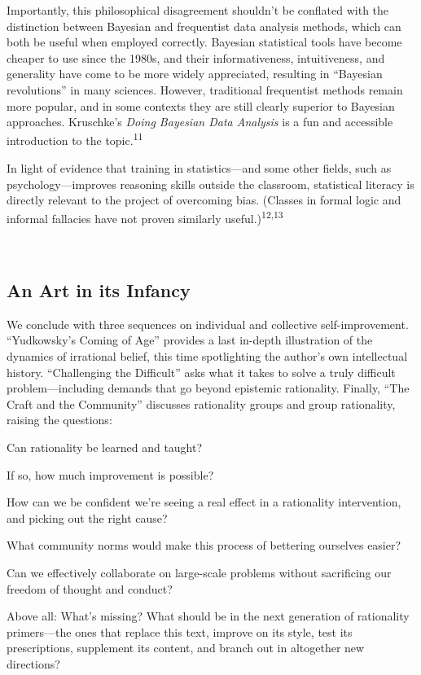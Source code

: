 {
 Importantly, this philosophical disagreement
shouldn't be conflated with the distinction between
Bayesian and frequentist data analysis methods, which can both be
useful when employed correctly. Bayesian statistical tools have become
cheaper to use since the 1980s, and their informativeness,
intuitiveness, and generality have come to be more widely appreciated,
resulting in ``Bayesian
revolutions'' in many sciences. However, traditional
frequentist methods remain more popular, and in some contexts they are
still clearly superior to Bayesian approaches.
Kruschke's \textit{Doing Bayesian Data Analysis} is a
fun and accessible introduction to the topic.\textsuperscript{11}}

{
 In light of evidence that training in statistics---and some other
fields, such as psychology---improves reasoning skills outside the
classroom, statistical literacy is directly relevant to the project of
overcoming bias. (Classes in formal logic and informal fallacies have
not proven similarly useful.)\textsuperscript{12,13}}

{
 ~}

\subsection{An Art in its Infancy}

{
 We conclude with three sequences on individual and collective
self-improvement. ``Yudkowsky's Coming
of Age'' provides a last in-depth illustration of the
dynamics of irrational belief, this time spotlighting the
author's own intellectual history.
``Challenging the Difficult'' asks
what it takes to solve a truly difficult problem---including demands
that go beyond epistemic rationality. Finally, ``The
Craft and the Community'' discusses rationality
groups and group rationality, raising the questions:}

{
 Can rationality be learned and taught?}

{
 If so, how much improvement is possible?}

{
 How can we be confident we're seeing a real effect
in a rationality intervention, and picking out the right cause?}

{
 What community norms would make this process of bettering
ourselves easier?}

{
 Can we effectively collaborate on large-scale problems without
sacrificing our freedom of thought and conduct?}

{
 Above all: What's missing? What should be in the
next generation of rationality primers---the ones that replace this
text, improve on its style, test its prescriptions, supplement its
content, and branch out in altogether new directions?}

